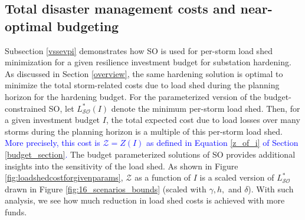\documentclass[authoryear,preprint,review,12pt]{elsarticle}\usepackage{amssymb}
\begin{document}
\subsection{Total disaster management costs and near-optimal budgeting} \label{tradeoff}

Subsection \ref{vssevpi} demonstrates how SO is used for per-storm load shed minimization for a given resilience investment budget for substation hardening. As discussed in Section \ref{overview}, the same hardening solution is optimal to minimize the total storm-related costs due to load shed during the planning horizon for the hardening budget. For the parameterized version of the budget-constrained SO, let $L_\mathcal{SO}^*(I)$ denote the minimum per-storm load shed. Then, for a given investment budget $I$, the total expected cost due to load losses over many storms during the planning horizon is a multiple of this per-storm load shed. \textcolor{blue}{More precisely, this cost is $\mathcal{Z} = Z(I)$ as defined in Equation \eqref{z_of_i} of Section \ref{budget_section}.} The budget parameterized solutions of SO provides additional insights into the sensitivity of the load shed. As shown in Figure \ref{fig:loadshedcostforgivenparams}, $\mathcal{Z}$ as a function of $I$ is a scaled version of $L_\mathcal{SO}^*$ drawn in Figure \ref{fig:16_scenarios_bounds} (scaled with $\gamma, h,$ and $\delta$). With such analysis, we see how much reduction in load shed costs is achieved with more funds.

\end{document}
